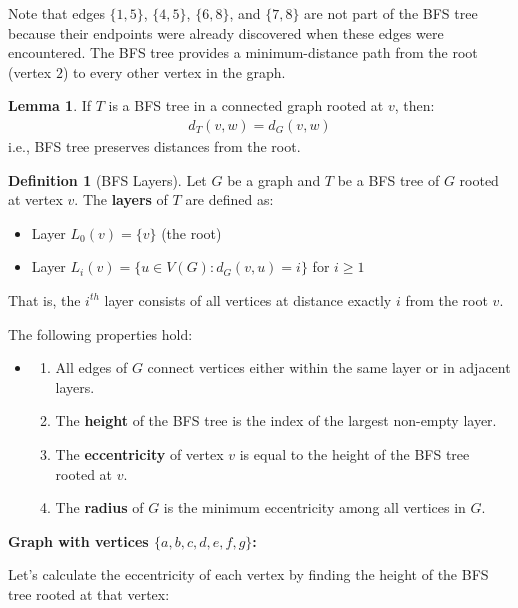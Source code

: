 \documentclass{article}
\theoremstyle{definition}
\newtheorem{lemma}{Lemma}
\newtheorem{definition}{Definition}
\begin{document}
Note that edges $\{1, 5\}$, $\{4, 5\}$, $\{6, 8\}$, and $\{7, 8\}$ are not 
part of the BFS tree because their endpoints were already discovered when these edges 
were encountered. The BFS tree provides a minimum-distance path from the root 
(vertex $2$) to every other vertex in the graph.

\pagebreak


\begin{lemma}
If $T$ is a BFS tree in a connected graph rooted at $v$, then:
\begin{align*}
d_T(v, w) = d_G(v, w)
\end{align*}
i.e., BFS tree preserves distances from the root.
\end{lemma}

\begin{definition}[BFS Layers]
Let $G$ be a graph and $T$ be a BFS tree of $G$ rooted at vertex $v$. The \textbf{layers} of $T$ are defined as:
\begin{itemize}
\item Layer $L_0(v) = \{v\}$ (the root)
\item Layer $L_i(v) = \{u \in V(G) : d_G(v,u) = i\}$ for $i \geq 1$
\end{itemize}

That is, the $i^{th}$ layer consists of all vertices at distance exactly $i$ from the root $v$.

The following properties hold:
\begin{itemize}
\item[] \begin{enumerate}
    \item All edges of $G$ connect vertices either within the same layer or in adjacent layers.
    \item The \textbf{height} of the BFS tree is the index of the largest non-empty layer.
    \item The \textbf{eccentricity} of vertex $v$ is equal to the height of the BFS tree rooted at $v$.
    \item The \textbf{radius} of $G$ is the minimum eccentricity among all vertices in $G$.
    \end{enumerate}
\end{itemize}
\end{definition}

\noindent\textbf{Graph with vertices $\{a, b, c, d, e, f, g\}$:}

Let's calculate the eccentricity of each vertex by finding the height of the BFS tree rooted at that vertex:
\end{document}
